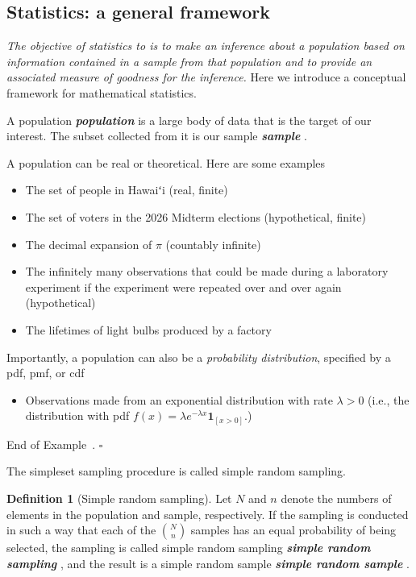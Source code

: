 \documentclass[10pt]{article}
\newcommand{\okina}{{\OkinaFallback ʻ}} %
\theoremstyle{definition}
\newtheorem{definition}[theorem]{Definition}
\newtheorem{example}[theorem]{Example}
\renewenvironment{example}
{\begin{oldexample}}
  {\par\smallskip\hfill   End of Example~\theexample. $\square$    \par\end{oldexample}}
\newcommand{\1}[1]{\textbf{1}_{\left[#1\right]}} %
\DeclareRobustCommand{\demph}[1]{%
  \ifmmode
  {\color{Blue}#1}%
  \else
  {\color{Blue}\bfseries\slshape #1}%
  \fi
}
\begin{document}
\subsection{Statistics: a general framework}


\textit{The objective of statistics to is to make an inference about a
  population based on information contained in a sample from that population
  and to provide an associated measure of goodness for the inference.} Here we
introduce a conceptual framework for mathematical statistics.


A \demph{population} is a large body of data that is the target of our
interest. The subset collected from it is our \demph{sample}. 

\begin{example}[Populations]
  A population can be real or theoretical. Here are some examples
  \begin{itemize}
    \item The set of people in Hawai{\okina}i (real, finite)
    \item The set of voters in the 2026 Midterm elections (hypothetical, finite)
    \item The decimal expansion of $\pi$ (countably infinite)
    \item The infinitely many observations that could be made during a
    laboratory experiment if the experiment were repeated over and over again
    (hypothetical)
    \item The lifetimes of light bulbs produced by a factory
  \end{itemize}
  Importantly, a population can also be a \textit{probability distribution},
  specified by a pdf, pmf, or cdf
  \begin{itemize}
    \item Observations made from an exponential distribution with rate $\lambda>0$ (i.e., the distribution with pdf $f(x)=\lambda e^{-\lambda x}\mathbf{1}_{\left[ x>0 \right] }$.)
  \end{itemize}
\end{example}


The simpleset sampling procedure is called simple random sampling.

\begin{definition}[Simple random sampling]
  Let $N$ and $n$ denote the numbers of elements in the population and sample,
  respectively. If the sampling is conducted in such a way that each of the
  ${N\choose n}$ samples has an equal probability of being selected, the
  sampling is called \demph{simple random sampling}, and the result is a
  \demph{simple random sample}.
\end{definition}
\end{document}
